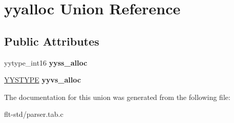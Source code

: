 \hypertarget{unionyyalloc}{}\section{yyalloc Union Reference}
\label{unionyyalloc}
\subsection*{Public Attributes}
\begin{DoxyCompactItemize}
\item 
\hypertarget{unionyyalloc_a4800e0520a89a4789afa7b5d82197e65}{}yytype\+\_\+int16 {\bfseries yyss\+\_\+alloc}\label{unionyyalloc_a4800e0520a89a4789afa7b5d82197e65}

\item 
\hypertarget{unionyyalloc_a9326f4fdc6f737a929444427836d8928}{}\hyperlink{unionYYSTYPE}{Y\+Y\+S\+T\+Y\+P\+E} {\bfseries yyvs\+\_\+alloc}\label{unionyyalloc_a9326f4fdc6f737a929444427836d8928}

\end{DoxyCompactItemize}


The documentation for this union was generated from the following file\+:\begin{DoxyCompactItemize}
\item 
flt-\/std/parser.\+tab.\+c\end{DoxyCompactItemize}
